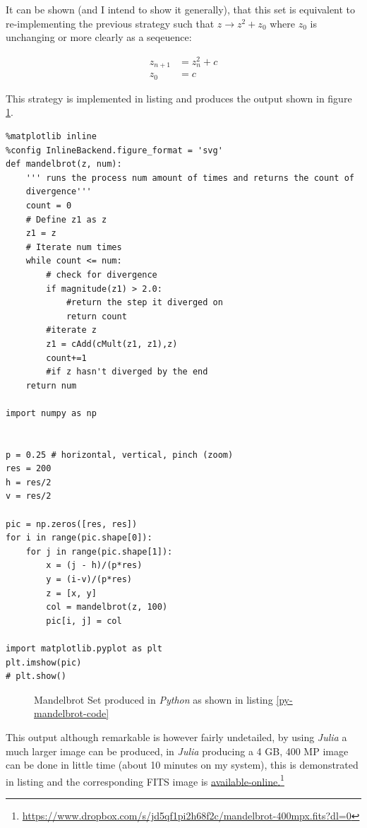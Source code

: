 \documentclass[11pt]{article}
\begin{document}
It can be shown (and I intend to show it generally), that this set is equivalent to re-implementing the previous strategy such that \(z \rightarrow z^{2} + z_{0}\) where \(z_{0}\) is unchanging or more clearly as a seqeuence:

\begin{align}
z_{n+1} &= z^{2}_n + c \label{eq:mb-sequence} \\
z_{0}   &= c
\end{align}

This strategy is implemented in listing and produces the output shown in figure \ref{mandelbrot-py-pic}.

\begin{lstlisting}
%matplotlib inline
%config InlineBackend.figure_format = 'svg'
def mandelbrot(z, num):
    ''' runs the process num amount of times and returns the count of
    divergence'''
    count = 0
    # Define z1 as z
    z1 = z
    # Iterate num times
    while count <= num:
        # check for divergence
        if magnitude(z1) > 2.0:
            #return the step it diverged on
            return count
        #iterate z
        z1 = cAdd(cMult(z1, z1),z)
        count+=1
        #if z hasn't diverged by the end
    return num

import numpy as np


p = 0.25 # horizontal, vertical, pinch (zoom)
res = 200
h = res/2
v = res/2

pic = np.zeros([res, res])
for i in range(pic.shape[0]):
    for j in range(pic.shape[1]):
        x = (j - h)/(p*res)
        y = (i-v)/(p*res)
        z = [x, y]
        col = mandelbrot(z, 100)
        pic[i, j] = col

import matplotlib.pyplot as plt
plt.imshow(pic)
# plt.show()
\end{lstlisting}

\begin{figure}[htbp]
\centering

\caption{\label{mandelbrot-py-pic}Mandelbrot Set produced in \emph{Python} as shown in listing \ref{py-mandelbrot-code}}
\end{figure}

This output although remarkable is however fairly undetailed, by using \emph{Julia} a much
larger image can be produced, in \emph{Julia} producing a 4 GB, 400 MP image can be done in little time
(about 10 minutes on my system), this is demonstrated in listing 
and the corresponding FITS image is \href{https://www.dropbox.com/s/jd5qf1pi2h68f2c/mandelbrot-400mpx.fits?dl=0}{available-online.}\footnote{\href{https://www.dropbox.com/s/jd5qf1pi2h68f2c/mandelbrot-400mpx.fits?dl=0}{https://www.dropbox.com/s/jd5qf1pi2h68f2c/mandelbrot-400mpx.fits?dl=0}}
\end{document}
